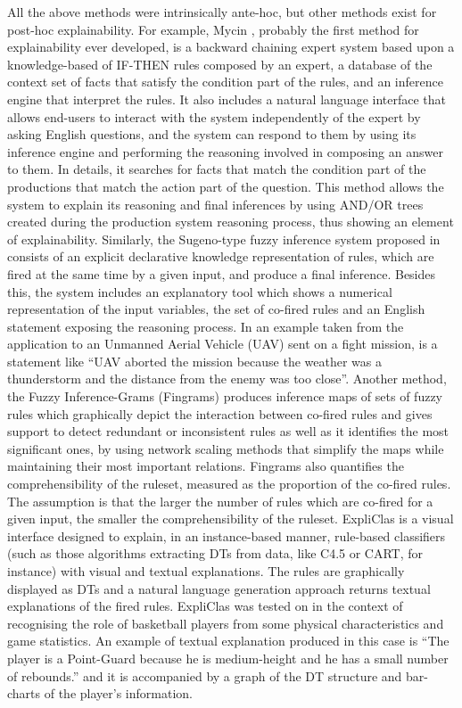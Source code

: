 \documentclass[final,1p,times]{elsarticle}
\begin{document}
All the above methods were intrinsically ante-hoc, but other methods exist for post-hoc explainability.
For example, Mycin \cite{shortliffe1975computer}, probably the first method for explainability ever developed, is a backward chaining expert system based upon a knowledge-based of IF-THEN rules composed by an expert, a database of the context set of facts that satisfy the condition part of the rules, and an inference engine that interpret the rules. 
It also includes a natural language interface that allows end-users to interact with the system independently of the expert by asking English questions, and the system can respond to them by using its inference engine and performing the reasoning involved in composing an answer to them. In details, it searches for facts that match the condition part of the productions that match the action part of the question. This method allows the system to explain its reasoning and final inferences by using AND/OR trees created during the production system reasoning process, thus showing an element of explainability.
Similarly, the Sugeno-type fuzzy inference system proposed in \cite{keneni2019evolving} consists of an explicit declarative knowledge representation of rules, which are fired at the same time by a given input, and produce a final inference.
Besides this, the system includes an explanatory tool which shows a numerical representation of the input variables, the set of co-fired rules and an English statement exposing the reasoning process. In an example taken from the application to an Unmanned Aerial Vehicle (UAV) sent on a fight mission, is a statement like ``UAV aborted the mission because the weather was a thunderstorm and the distance from the enemy was too close''.
Another method, the Fuzzy Inference-Grams (Fingrams)  \cite{pancho2013fingrams} produces inference maps of sets of fuzzy rules which graphically depict the interaction between co-fired rules and gives support to detect redundant or inconsistent rules as well as it identifies the most significant ones, by using network scaling methods that simplify the maps while maintaining their most important relations. Fingrams also quantifies the comprehensibility of the ruleset, measured as the proportion of the co-fired rules. The assumption is that the larger the number of rules which are co-fired for a given input, the smaller the comprehensibility of the ruleset.
ExpliClas \cite{alonso2019explainable} is a visual interface designed to explain, in an instance-based manner, rule-based classifiers (such as those algorithms extracting DTs from data, like C4.5 or CART, for instance) with visual and textual explanations. The rules are graphically displayed as DTs and a natural language generation approach returns textual explanations of the fired rules.
ExpliClas was tested on in the context of recognising the role of basketball players from some physical characteristics and game statistics. An example of textual explanation produced in this case is ``The player is a Point-Guard because he is medium-height and he has a small number of rebounds.'' and it is accompanied by a graph of the DT structure and bar-charts of the player's information.
\end{document}
